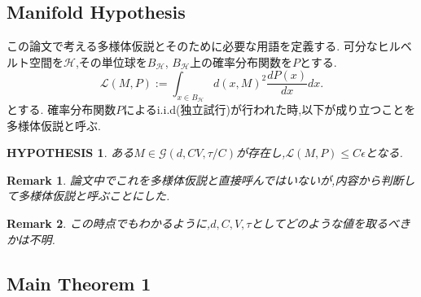 \documentclass{ujarticle}
\newtheorem*{rem}{Remark}
\newtheorem{hyp}{HYPOTHESIS}
\begin{document}
\subsection{Manifold Hypothesis}
\label{sub:多様体仮説}
この論文で考える多様体仮説とそのために必要な用語を定義する.
可分なヒルベルト空間を$\mathcal{H}$,その単位球を$B_{\mathcal{H}}$,
$B_{\mathcal{H}}$上の確率分布関数を$P$とする.
\begin{equation*}
 \mathcal{L}(M,P):=\int_{x \in B_{\mathcal{H}}} d(x,M)^2\frac{dP(x)}{dx}dx.
\end{equation*}
とする.
確率分布関数$P$によるi.i.d(独立試行)が行われた時,以下が成り立つことを多様体仮説と呼ぶ.
\begin{hyp}
  ある$M \in \mathcal{G}(d,CV,\tau/C)$が存在し,$\mathcal{L}(M,P) \le C \epsilon$となる.
\end{hyp}
\begin{rem}
 論文中でこれを多様体仮説と直接呼んではいないが,内容から判断して多様体仮説と呼ぶことにした.
\end{rem}
\begin{rem}
 この時点でもわかるように,$d,C,V,\tau$としてどのような値を取るべきかは不明.
\end{rem}

\subsection{Main Theorem 1}
\label{sub:主結果その1}
\end{document}
